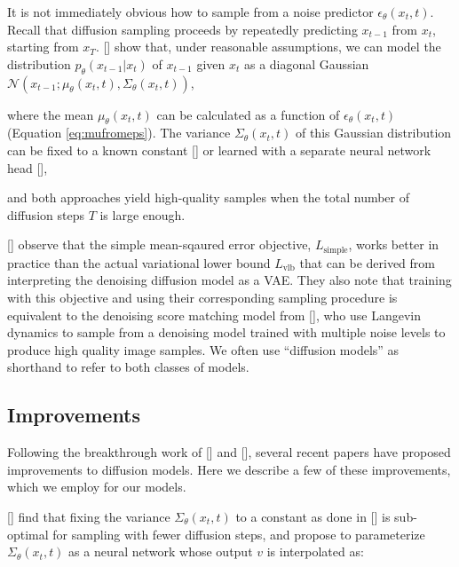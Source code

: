 It is not immediately obvious how to sample from a noise predictor $\epsilon_{\theta}(x_t,t)$. Recall that diffusion sampling proceeds by repeatedly predicting $x_{t-1}$ from $x_t$, starting from $x_T$. \citeauthor{ddpm} [] show that, under reasonable assumptions, we can model the distribution $p_{\theta}(x_{t-1}|x_t)$ of $x_{t-1}$ given $x_t$ as a diagonal Gaussian $\mathcal{N}(x_{t-1};\mu_{\theta}(x_t, t), \Sigma_{\theta}(x_t, t))$,

where the mean $\mu_{\theta}(x_t, t)$ can be calculated as a function of $\epsilon_{\theta}(x_t,t)$ (Equation \ref{eq:mufromeps}). 
The variance $\Sigma_{\theta}(x_t,t)$ of this Gaussian distribution can be fixed to a known constant [] or learned with a separate neural network head [], 

and both approaches yield high-quality samples when the total number of diffusion steps $T$ is large enough.

\citeauthor{ddpm} [] observe that the simple mean-sqaured error objective,  $L_{\text{simple}}$, works better in practice than the actual variational lower bound $L_{\text{vlb}}$ that can be derived from interpreting the denoising diffusion model as a VAE. They also note that training with this objective and using their corresponding sampling procedure is equivalent to the denoising score matching model from \citeauthor{improvedscore} [], who use Langevin dynamics to sample from a denoising model trained with multiple noise levels to produce high quality image samples. We often use ``diffusion models'' as shorthand to refer to both classes of models.

\subsection{Improvements}
Following the breakthrough work of \citeauthor{improvedscore} [] and \citeauthor{ddpm} [], several recent papers have proposed improvements to diffusion models. Here we describe a few of these improvements, which we employ for our models.

\citeauthor{improved} [] find that fixing the variance $\Sigma_{\theta}(x_t,t)$ to a constant as done in \citeauthor{ddpm} [] is sub-optimal for sampling with fewer diffusion steps, and propose to parameterize $\Sigma_{\theta}(x_t,t)$ as a neural network whose output $v$ is interpolated as:

